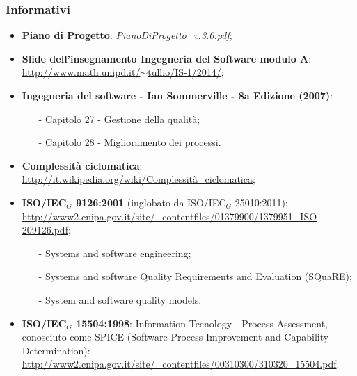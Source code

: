 \subsubsection{Informativi}
\begin{itemize}
	\item \textbf{Piano di Progetto}: \textit{PianoDiProgetto\_v.3.0.pdf};
	\item \textbf{Slide dell'insegnamento Ingegneria del Software modulo A}:\\ \href{http://www.math.unipd.it/~tullio/IS-1/2014/}{http://www.math.unipd.it/$\sim$tullio/IS-1/2014/};
	\item \textbf{Ingegneria del software - Ian Sommerville - 8a Edizione (2007)}:
	\begin{itemize}
		\item[-] Capitolo 27 - Gestione della qualità;
		\item[-] Capitolo 28 - Miglioramento dei processi.
	\end{itemize}
	\item \textbf{Complessità ciclomatica}: \href {http://it.wikipedia.org/wiki/Complessità\_ciclomatica}{http://it.wikipedia.org/wiki/Complessità\_ciclomatica};
	\item \textbf{ISO/IEC$_G$ 9126:2001} (inglobato da ISO/IEC$_G$ 25010:2011):\\
	\href{http://www2.cnipa.gov.it/site/_contentfiles/01379900/1379951_ISO \%209126.pdf}{http://www2.cnipa.gov.it/site/\_contentfiles/01379900/1379951\_ISO  209126.pdf};	\begin{itemize}
		\item[-] Systems and software engineering;
		\item[-] Systems and software Quality Requirements and Evaluation (SQuaRE);
		\item[-] System and software quality models.
	\end{itemize}
	\item \textbf{ISO/IEC$_G$ 15504:1998}: Information Tecnology - Process Assessment, conosciuto come SPICE (Software Process Improvement and Capability Determination): \href{http://www2.cnipa.gov.it/site/_contentfiles/00310300/310320_15504.pdf}{http://www2.cnipa.gov.it/site/\_contentfiles/00310300/310320\_15504.pdf}.
\end{itemize}